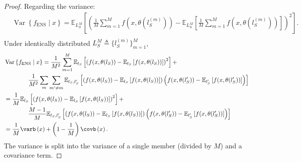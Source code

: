\begin{proof}
    Regarding the variance:
    \begin{align*}
        &\operatorname{Var}\left\{f_{\text{ENS}} \mid x\right\}=\mathbb{E}_{L_S^M}\left[\left(\frac{1}{M} \sum_{m=1}^{M} f(x, \theta(l_S^{(m)}))-\mathbb{E}_{L_S^M}\left[\frac{1}{M} \sum_{m=1}^{M} f(x, \theta(l_S^{(m)}))\right]\right)^{2}\right].\\
    \end{align*}
    Under identically distributed $L_S^M\triangleq\{l_S^{(m)}\}_{m=1}^M$,
    \begin{align*}
        &\operatorname{Var}\left\{f_{\text{ENS}} \mid x\right\} = \frac{1}{M^{2}} \sum_{m=1}^{M} \mathbb{E}_{l_S}\left[\left(f(x, \theta(l_S))-\mathbb{E}_{l_S}\left[f(x, \theta(l_S))\right]\right)^{2}\right]+ \\
        &\quad\quad\quad\quad \frac{1}{M^{2}} \sum_{m} \sum_{m^{\prime} \neq m} \mathbb{E}_{l_S, l_S^\prime}\left[\left(f(x, \theta(l_S))-\mathbb{E}_{l_S}\left[f(x, \theta(l_S))\right]\right)\left(f(x, \theta(l_S^\prime))-\mathbb{E}_{l_S^\prime}\left[f(x, \theta(l_S^\prime))\right]\right)\right] \\
        &= \frac{1}{M} \mathbb{E}_{l_S}\left[\left(f(x, \theta(l_S))-\mathbb{E}_{l_S}\left[f(x, \theta(l_S))\right]\right)^{2}\right] + \\
        &\quad\quad\quad\quad \frac{M-1}{M}\mathbb{E}_{l_S, l_S^\prime}\left[\left(f(x, \theta(l_S))-\mathbb{E}_{l_S}\left[f(x, \theta(l_S))\right]\right)\left(f(x, \theta(l_S^\prime))-\mathbb{E}_{l_S^\prime}\left[f(x, \theta(l_S^\prime))\right]\right)\right] \\
        &=\frac{1}{M} \varb\left(x\right)+\left(1-\frac{1}{M}\right) \covb\left(x\right).
    \end{align*}
    The variance is split into the variance of a single member (divided by $M$) and a covariance term.

\end{proof}
